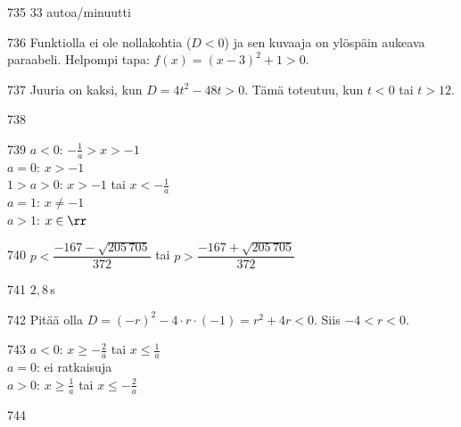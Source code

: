 \begin{Vastaus}{735}
        $33$ autoa/minuutti
    
\end{Vastaus}
\begin{Vastaus}{736}
	Funktiolla ei ole nollakohtia ($D<0$) ja sen kuvaaja on ylöspäin aukeava paraabeli.
    Helpompi tapa: $f(x)= (x-3)^2+1 >0.$
    
\end{Vastaus}
\begin{Vastaus}{737}
		Juuria on kaksi, kun $D=4t^2-48t>0$. Tämä toteutuu, kun $t < 0$ tai $t > 12$.
	
\end{Vastaus}
\begin{Vastaus}{738}
    
\end{Vastaus}
\begin{Vastaus}{739}
        $a < 0$: $-\frac{1}{a} > x > -1$ \\ $a = 0$: $x > -1$ \\ $1 > a > 0$: $x > -1$ tai $x < -\frac{1}{a}$ \\ $a = 1$: $x \neq -1$ \\ $a > 1$: $x \in \rr$
    
\end{Vastaus}
\begin{Vastaus}{740}
        $p<\dfrac{-167-\sqrt{205\,705}}{372}$ tai $p>\dfrac{-167+\sqrt{205\,705}}{372}$
    
\end{Vastaus}
\begin{Vastaus}{741}
	$2,8$\,s
    
\end{Vastaus}
\begin{Vastaus}{742}
		Pitää olla $D=(-r)^2-4 \cdot r \cdot (-1)=r^2+4r<0$. Siis $-4 < r < 0$.
	
\end{Vastaus}
\begin{Vastaus}{743}
        $a < 0$: $x \geq -\frac{2}{a}$ tai $x \leq \frac{1}{a}$ \\ $a = 0$: ei ratkaisuja \\ $a > 0$: $x \geq \frac{1}{a}$ tai $x \leq -\frac{2}{a}$
    
\end{Vastaus}
\begin{Vastaus}{744}
	
\end{Vastaus}
